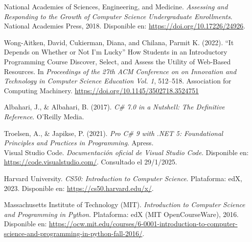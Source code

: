 \documentclass{article}
\begin{document}
\begin{thebibliography}{99}
 National Academies of Sciences, Engineering, and Medicine. \textit{Assessing and Responding to the Growth of Computer Science Undergraduate Enrollments}. National Academies Press, 2018. Disponible en: \url{https://doi.org/10.17226/24926}.

Wong-Aitken, David, Cukierman, Diana, and Chilana, Parmit K. (2022). 
``It Depends on Whether or Not I'm Lucky'' How Students in an Introductory Programming Course Discover, Select, and Assess the Utility of Web-Based Resources. 
In \textit{Proceedings of the 27th ACM Conference on on Innovation and Technology in Computer Science Education Vol. 1}, 512–518. 
Association for Computing Machinery. 
\url{https://doi.org/10.1145/3502718.3524751}

Albahari, J., \& Albahari, B. (2017). \textit{C\# 7.0 in a Nutshell: The Definitive Reference}. O'Reilly Media.

Troelsen, A., \& Japikse, P. (2021). \textit{Pro C\# 9 with .NET 5: Foundational Principles and Practices in Programming}. Apress. \\

 Visual Studio Code. \textit{Documentación oficial de Visual Studio Code}. Disponible en: \url{https://code.visualstudio.com/}. Consultado el 29/1/2025.

Harvard University.
\textit{CS50: Introduction to Computer Science}.
Plataforma: edX, 2023.
Disponible en: \url{https://cs50.harvard.edu/x/}.

Massachusetts Institute of Technology (MIT).
\textit{Introduction to Computer Science and Programming in Python}.
Plataforma: edX (MIT OpenCourseWare), 2016.
Disponible en: \url{https://ocw.mit.edu/courses/6-0001-introduction-to-computer-science-and-programming-in-python-fall-2016/}.

\end{thebibliography}
\end{document}
